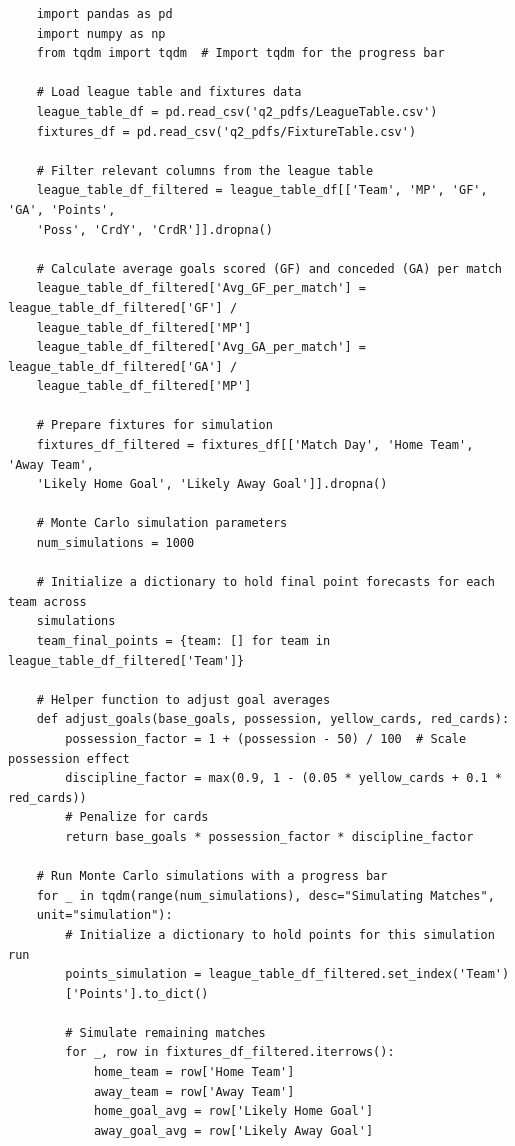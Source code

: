 \documentclass{article}
\begin{document}
\begin{verbatim}
    import pandas as pd
    import numpy as np
    from tqdm import tqdm  # Import tqdm for the progress bar

    # Load league table and fixtures data
    league_table_df = pd.read_csv('q2_pdfs/LeagueTable.csv')
    fixtures_df = pd.read_csv('q2_pdfs/FixtureTable.csv')

    # Filter relevant columns from the league table
    league_table_df_filtered = league_table_df[['Team', 'MP', 'GF', 'GA', 'Points', 
    'Poss', 'CrdY', 'CrdR']].dropna()

    # Calculate average goals scored (GF) and conceded (GA) per match
    league_table_df_filtered['Avg_GF_per_match'] = league_table_df_filtered['GF'] / 
    league_table_df_filtered['MP']
    league_table_df_filtered['Avg_GA_per_match'] = league_table_df_filtered['GA'] / 
    league_table_df_filtered['MP']

    # Prepare fixtures for simulation
    fixtures_df_filtered = fixtures_df[['Match Day', 'Home Team', 'Away Team', 
    'Likely Home Goal', 'Likely Away Goal']].dropna()

    # Monte Carlo simulation parameters
    num_simulations = 1000

    # Initialize a dictionary to hold final point forecasts for each team across 
    simulations
    team_final_points = {team: [] for team in league_table_df_filtered['Team']}

    # Helper function to adjust goal averages
    def adjust_goals(base_goals, possession, yellow_cards, red_cards):
        possession_factor = 1 + (possession - 50) / 100  # Scale possession effect
        discipline_factor = max(0.9, 1 - (0.05 * yellow_cards + 0.1 * red_cards))  
        # Penalize for cards
        return base_goals * possession_factor * discipline_factor

    # Run Monte Carlo simulations with a progress bar
    for _ in tqdm(range(num_simulations), desc="Simulating Matches", 
    unit="simulation"):
        # Initialize a dictionary to hold points for this simulation run
        points_simulation = league_table_df_filtered.set_index('Team')
        ['Points'].to_dict()

        # Simulate remaining matches
        for _, row in fixtures_df_filtered.iterrows():
            home_team = row['Home Team']
            away_team = row['Away Team']
            home_goal_avg = row['Likely Home Goal']
            away_goal_avg = row['Likely Away Goal']
            

\end{verbatim}
\end{document}
